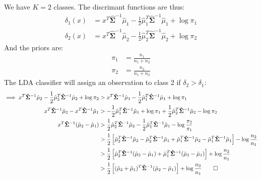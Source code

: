 \documentclass[11pt,twoside]{article}
\newcommand{\lt}{\left}
\newcommand{\rt}{\right}
\newcommand{\?}{\stackrel{?}{=}}
\newcommand{\fr}{\frac}
\newcommand{\bl}{\color{blue!80!black}}
\newenvironment{solution}
{\medskip\par\begin{adjustwidth}{.01\textwidth}{.01\textwidth}\bl}{\medskip\end{adjustwidth}}
\begin{document}
\begin{enumerate}[\bf (a)]
  \begin{solution}
    We have $K=2$ classes. The discrimant functions are thus:
    \begin{align*}
      \delta_1(x) &= x^T\bm{\hat\Sigma}^{-1}\hat\mu_1 - \fr12\hat\mu_1^T\bm{\hat\Sigma}^{-1}\hat\mu_1 + \log\pi_1 \\
      \delta_2(x) &= x^T\bm{\hat\Sigma}^{-1}\hat\mu_2 - \fr12\hat\mu_2^T\bm{\hat\Sigma}^{-1}\hat\mu_2 + \log\pi_2
    \end{align*}
    And the priors are:
    \begin{align*}
      \pi_{1} &= \fr{n_{1}}{n_{1} + n_{2}} \\
      \pi_{2} &= \fr{n_{2}}{n_{1} + n_{2}}
    \end{align*}
    The LDA classifier will assign an observation to class 2 if $\delta_{2} > \delta_{1}$:
    \begin{align*}
      \implies x^T\bm{\hat\Sigma}^{-1}\hat\mu_2
      - \fr12\hat\mu_2^T\bm{\hat\Sigma}^{-1}\hat\mu_2 + \log\pi_2
      & >   x^T\bm{\hat\Sigma}^{-1}\hat\mu_1 - \fr12\hat\mu_1^T\bm{\hat\Sigma}^{-1}\hat\mu_1 + \log\pi_1 \\                                    x^T\bm{\hat\Sigma}^{-1}\hat\mu_2 - x^T\bm{\hat\Sigma}^{-1}\hat\mu_1
      & >   - \fr12\hat\mu_1^T\bm{\hat\Sigma}^{-1}\hat\mu_1 + \log\pi_1  + \fr12\hat\mu_2^T\bm{\hat\Sigma}^{-1}\hat\mu_2 - \log\pi_2 \\     
      x^T\bm{\hat\Sigma}^{-1}(\hat\mu_2 - \hat\mu_{1})
      & > \fr12\hat\mu_2^T\bm{\hat\Sigma}^{-1}\hat\mu_2
        -  \fr12\hat\mu_1^T\bm{\hat\Sigma}^{-1}\hat\mu_1
        - \log\fr{\pi_2}{\pi_{1}} \\
      ~
      & > \fr12\lt[
        \hat\mu_2^T\bm{\hat\Sigma}^{-1}\hat\mu_2 -
        \hat\mu_2^T\bm{\hat\Sigma}^{-1}\hat\mu_1 +
        \hat\mu_1^T\bm{\hat\Sigma}^{-1}\hat\mu_2 -
        \hat\mu_1^T\bm{\hat\Sigma}^{-1}\hat\mu_1
        \rt] - \log\fr{n_2}{n_{1}} \\
      ~
      & >  \fr12\lt[
        \hat\mu_2^T\bm{\hat\Sigma}^{-1}(\hat\mu_2 - \hat\mu_{1}) + \hat\mu_1^T\bm{\hat\Sigma}^{-1}(\hat\mu_2 - \hat\mu_{1})
        \rt] + \log\fr{n_{2}}{n_{1}} \\
      ~
      & >  \fr12\lt[ ( \hat\mu_2 + \hat\mu_{1})^T
        \bm{\hat\Sigma}^{-1}(\hat\mu_2 - \hat\mu_{1}) \rt] + \log\fr{n_{2}}{n_{1}} \qed
    \end{align*}
  \end{solution}
\end{enumerate}
\end{document}
